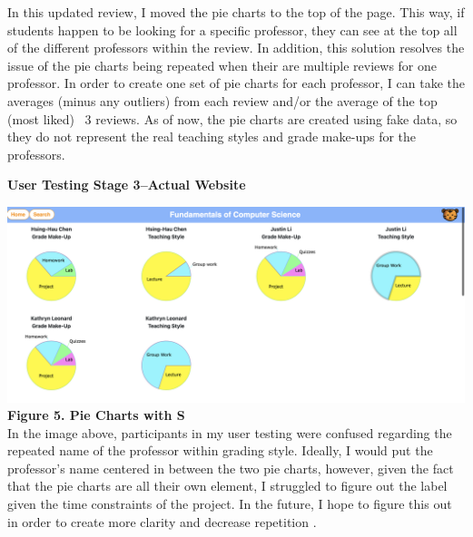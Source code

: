 \documentclass[10pt,twocolumn]{article}
\begin{document}
In this updated review, I moved the pie charts to the top of the page. This way, if students happen to be looking for a specific professor, they can see at the top all of the different professors within the review. In addition, this solution resolves the issue of the pie charts being repeated when their are multiple reviews for one professor. In order to create one set of pie charts for each professor, I can take the averages (minus any outliers) from each review and/or the average of the top (most liked) ~3 reviews. As of now, the pie charts are created using fake data, so they do not represent the real teaching styles and grade make-ups for the professors. 

{\centering \textbf{User Testing Stage 3--Actual Website}\par}


\includegraphics[scale=.165]{UT5}\\ \textbf{\footnotesize{Figure 5. Pie Charts with S}}\\


In the image above, participants in my user testing were confused regarding the repeated name of the professor within grading style. Ideally, I would put the professor's name centered in between the two pie charts, however, given the fact that the pie charts are all their own element, I struggled to figure out the label given the time constraints of the project. In the future, I hope to figure this out in order to create more clarity and decrease repetition \cite{noname08}. \\
\end{document}
